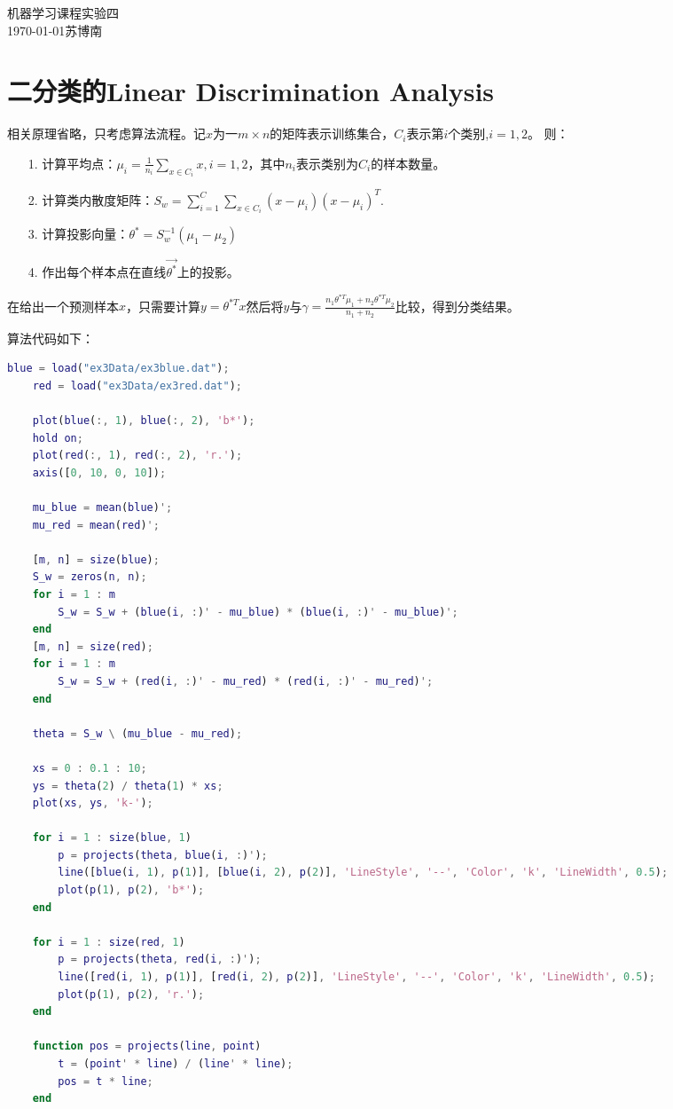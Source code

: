 \documentclass{article}
\begin{document}
\begin{center}
    \huge{机器学习课程实验四}\\
    \large{\today \quad 苏博南}
\end{center}

\section{二分类的Linear Discrimination Analysis}

相关原理省略，只考虑算法流程。记$x$为一$m\times n$的矩阵表示训练集合，$C_i$表示第$i$个类别,$i=1,2$。
则：
\begin{itemize}
    \item [1.] 计算平均点：$\mu_i=\frac{1}{n_i}\sum_{x\in C_i}x,i=1,2$，其中$n_i$表示类别为$C_i$的样本数量。
    \item [2.] 计算类内散度矩阵：$S_w=\sum_{i=1}^C\sum_{x\in C_i}(x-\mu_i)(x-\mu_i)^T$.
    \item [3.] 计算投影向量：$\theta^*=S_w^{-1}(\mu_1-\mu_2)$
    \item [4.] 作出每个样本点在直线$\overrightarrow{\theta^*}$上的投影。
\end{itemize}

在给出一个预测样本$x$，只需要计算$y=\theta^{*T}x$然后将$y$与$\gamma=\frac{n_1\theta^{*T}\mu_1+n_2\theta^{*T}\mu_2}{n_1+n_2}$比较，得到分类结果。

算法代码如下：
\begin{lstlisting}[language=matlab]
    blue = load("ex3Data/ex3blue.dat");
    red = load("ex3Data/ex3red.dat");

    plot(blue(:, 1), blue(:, 2), 'b*');
    hold on;
    plot(red(:, 1), red(:, 2), 'r.');
    axis([0, 10, 0, 10]);

    mu_blue = mean(blue)';
    mu_red = mean(red)';

    [m, n] = size(blue);
    S_w = zeros(n, n);
    for i = 1 : m
        S_w = S_w + (blue(i, :)' - mu_blue) * (blue(i, :)' - mu_blue)';
    end
    [m, n] = size(red);
    for i = 1 : m
        S_w = S_w + (red(i, :)' - mu_red) * (red(i, :)' - mu_red)';
    end

    theta = S_w \ (mu_blue - mu_red);

    xs = 0 : 0.1 : 10;
    ys = theta(2) / theta(1) * xs;
    plot(xs, ys, 'k-');

    for i = 1 : size(blue, 1)
        p = projects(theta, blue(i, :)');
        line([blue(i, 1), p(1)], [blue(i, 2), p(2)], 'LineStyle', '--', 'Color', 'k', 'LineWidth', 0.5);
        plot(p(1), p(2), 'b*');
    end

    for i = 1 : size(red, 1)
        p = projects(theta, red(i, :)');
        line([red(i, 1), p(1)], [red(i, 2), p(2)], 'LineStyle', '--', 'Color', 'k', 'LineWidth', 0.5);
        plot(p(1), p(2), 'r.');
    end

    function pos = projects(line, point)
        t = (point' * line) / (line' * line);
        pos = t * line;
    end
\end{lstlisting}
\end{document}

